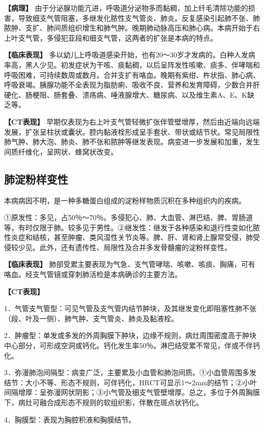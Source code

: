 \textbf{【病理】}
由于分泌腺功能亢进，呼吸道分泌物多而黏稠，加上纤毛清除功能的损害，导致细支气管阻塞，多继发化脓性支气管炎、肺炎。反复感染引起肺不张、肺脓肿、支扩、肺间质组织增生和肺气肿。晚期肺动脉高压和肺心病。本病开始于右上叶支气管，多侵犯亚段和细支气管，这两者的扩张是本病的特点。

\textbf{【临床表现】}
多以幼儿上呼吸道感染开始，也有20～30岁才发病的。白种人发病率高，黑人少见。初发症状为干咳、痰黏稠，以后呈阵发性咳嗽、痰多、伴哮喘和呼吸困难，可持续数周或数月。合并支扩有咯血。晚期有紫绀、杵状指、肺心病、呼吸衰竭。胰腺功能不全表现为脂肪痢、吸收不良、营养和发育障碍，少数合并肝硬化、肠梗阻、肠套叠、溃疡病、唾液腺增大、糖尿病、以及维生素A、E、K缺乏等。

\textbf{【CT表现】}
早期仅表现为右上叶支气管轻微扩张伴管壁增厚，然后由近端向远端发展，扩张呈柱状或囊状。腔内黏液栓形成呈手套状、带状或结节状。常见局限性肺气肿、肺大泡、肺炎、肺不张和脓肿等继发表现。病变进一步发展和加重，发生间质纤维化，呈网状、蜂窝状改变。

\subsection{肺淀粉样变性}

本病病因不明，是一种多糖蛋白组成的淀粉样物质沉积在多种组织内的疾病。

①原发性：多见，占50％～70％。多侵犯心、肺、大血管、淋巴结、脾、胃肠道等，有时仅限于肺。较多见于男性。②继发性：继发于各种感染和退行性变如化脓性炎症和结核，甚至肿瘤、类风湿性关节炎等。脾、肝、肾和肾上腺常受侵，肺受侵较少见。此外，还有遗传性、局限性及合并多发骨髓瘤的淀粉样变性。

\textbf{【临床表现】}
肺部受累主要表现为气急、支气管哮喘、咳嗽、咳痰、胸痛，可有咯血。经支气管镜或穿刺肺活检是本病确诊的主要方法。

\textbf{【CT表现】}

1．气管支气管型：可见气管及支气管内结节肿块，及其继发变化即阻塞性肺不张（段、叶及一侧）、肺气肿、支气管炎、肺炎及黏液栓。

2．肿瘤型：单发或多发的外周胸膜下肿块，边缘不规则，病灶周围密度高于肿块中心部分，可形成空洞或钙化。钙化发生率50％。淋巴结受累不常见，伴或不伴钙化。

3．弥漫肺泡间隔型：病变广泛，主要累及小血管和肺泡间质。①小血管周围多发结节：大小不等、形态不规则，可伴钙化，HRCT可显示1～2mm的结节；②小叶间隔增厚：呈弥漫网状阴影；③小气管及细支气管壁增厚。总之，多位于外周胸膜下，病灶可融合成形态不规则的软组织影，伴散在斑点状钙化。

4．胸膜型：表现为胸腔积液和胸膜结节。

